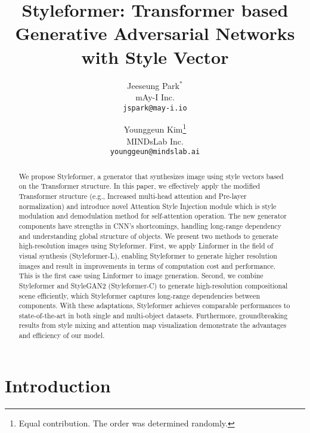 \documentclass[10pt,twocolumn,letterpaper]{article}
\begin{document}
\title{Styleformer: Transformer based Generative Adversarial Networks with Style Vector}


\author{Jeeseung Park$^*$\\
mAy-I Inc.\\
{\tt\small jspark@may-i.io}
\and
Younggeun Kim\thanks{Equal contribution. The order was determined randomly.}\\
MINDsLab Inc.\\
{\tt\small younggeun@mindslab.ai}
}
\maketitle

\begin{abstract}


 We propose Styleformer, a generator that synthesizes image using style vectors based on the Transformer structure. 
In this paper, we effectively apply the modified Transformer structure (e.g., Increased multi-head attention and Pre-layer normalization) and introduce novel Attention Style Injection module which is style modulation and demodulation method for self-attention operation.
The new generator components have strengths in CNN's shortcomings, handling long-range dependency and understanding global structure of objects. 
We present two methods to generate high-resolution images using Styleformer. 
First, we apply Linformer in the field of visual synthesis (Styleformer-L), enabling Styleformer to generate higher resolution images and result in improvements in terms of computation cost and performance. This is the first case using Linformer to image generation.
Second, we combine Styleformer and StyleGAN2 (Styleformer-C) to generate high-resolution compositional scene efficiently, which Styleformer captures long-range dependencies between components. With these adaptations, Styleformer achieves comparable performances to state-of-the-art in both single and multi-object datasets. Furthermore, groundbreaking results from style mixing and attention map visualization demonstrate the advantages and efficiency of our model.











\end{abstract}

\section{Introduction}
\label{sec:intro}
\end{document}
